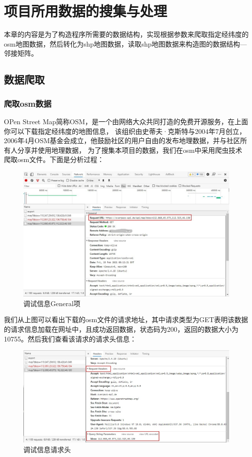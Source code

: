 \chapter{项目所用数据的搜集与处理}
本章的内容是为了构造程序所需要的数据结构，实现根据参数来爬取指定经纬度的osm地图数据，然后转化为shp地图数据，读取shp地图数据来构造图的数据结构---邻接矩阵。
\section{数据爬取}
\subsection{爬取osm数据}
OPen Street Map简称OSM，是一个由网络大众共同打造的免费开源服务，在上面你可以下载指定经纬度的地图信息，
该组织由史蒂夫·克斯特与2004年7月创立，2006年4月OSM基金会成立，他鼓励社区的用户自由的发布地理数据，并与社区所有人分享并使用地理数据，
为了搜集本项目的数据，我们在osm中采用爬虫技术爬取osm文件。下面是分析过程：\\
\begin{figure}[H]
    \centering
    \includegraphics[width=13cm]{figure/osm_1.jpg}
    \caption{调试信息General项}
    \label{fig-tsxx1}
\end{figure}
我们从上图可以看出下载的osm文件的请求地址，其中请求类型为GET表明该数据的请求信息加载在网址中，且成功返回数据，状态码为200，返回的数据大小为10755。然后我们查看该请求的请求头信息：\\
\begin{figure}[H]
    \centering
    \includegraphics[width=13cm]{figure/osm_2.jpg}
    \caption{调试信息请求头}
    \label{fig-tsxx2}
\end{figure}
